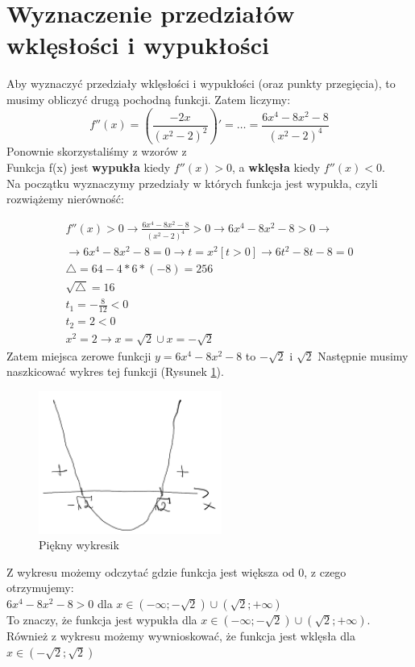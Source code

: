 \documentclass[10pt]{article}
\begin{document}
{{\section{Wyznaczenie przedziałów wklęsłości i wypukłości}
Aby wyznaczyć przedziały wklęsłości i wypukłości (oraz punkty przegięcia), to musimy obliczyć drugą pochodną funkcji. Zatem liczymy:
{\large \begin{equation}
f''(x) = \left(\frac{-2x}{(x^2-2)^2}\right)' = \dots = \frac{6x^4 - 8x^2 -8}{(x^2 -2)^4}
\end{equation}}
Ponownie skorzystaliśmy z wzorów z \cite{wzorki} \\
Funkcja f(x) jest {\bf wypukła} kiedy $f''(x) > 0$, a {\bf wklęsła} kiedy $f''(x) < 0$. \\
Na początku wyznaczymy przedziały w których funkcja jest wypukła, czyli rozwiążemy nierówność:
{\large \begin{eqnarray}
f''(x) > 0 \rightarrow \frac{6x^4 - 8x^2 -8}{(x^2 -2)^4} > 0 \rightarrow 6x^4 - 8x^2 -8 > 0 \rightarrow \\ \rightarrow 6x^4 - 8x^2 -8 = 0 \rightarrow t=x^2 [t>0] \rightarrow 6t^2 - 8t - 8 = 0 \nonumber \\
\triangle = 64 - 4 * 6 * (-8) = 256 \nonumber \\
\sqrt{\triangle} = 16 \nonumber \\
t_1 = -\frac{8}{12} < 0 \nonumber \\
t_2 = 2 < 0 \nonumber \\
x^2 = 2 \rightarrow x = \sqrt{2} \cup x = -\sqrt{2} \nonumber 
\end{eqnarray}
Zatem miejsca zerowe funkcji $y = 6x^4 - 8x^2 - 8$ to $-\sqrt{2}$ i $\sqrt{2}$
Następnie musimy naszkicować wykres tej funkcji (Rysunek \ref{fig:Wykres}). \\
\begin{figure} \begin{center}
\includegraphics[width=6cm]{przyklad1a}
\caption{Piękny wykresik}
\label{fig:Wykres}
\end{center}
\end{figure} $$ $$
\noindent Z wykresu możemy odczytać gdzie funkcja jest większa od 0, z czego otrzymujemy: \\
$6x^4 - 8x^2 - 8 > 0$ dla $ x \in (-\infty; -\sqrt{2})\cup(\sqrt{2}; +\infty)$ \\
To znaczy, że funkcja jest wypukła dla $ x \in (-\infty; -\sqrt{2})\cup(\sqrt{2}; +\infty)$. Również z wykresu możemy wywnioskować, że funkcja jest wklęsła dla $ x \in (-\sqrt{2}; \sqrt{2})$
}}}
\end{document}
